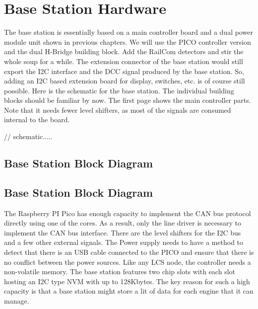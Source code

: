 \chapter{Base Station Hardware}

The base station is essentially based on a main controller board and a dual power module unit shown in previous chapters. We will use the PICO controller version and the dual H-Bridge building block. Add the RailCom detectors and stir the whole soup for a while. The extension connector of the base station would still export the I2C interface and the DCC signal produced by the base station. So, adding an I2C based extension board for display, switches, etc. is of course still possible. Here is the schematic for the base station. The individual building blocks should be familiar by now. The first page shows the main controller parts. Note that it needs fewer level shifters, as most of the signals are consumed internal to the board.

// schematic.....

\section{Base Station Block Diagram}


\section{Base Station Block Diagram}

The Raspberry PI Pico has enough capacity to implement the CAN bus protocol directly using one of the cores. As a result, only the line driver is necessary to implement the CAN bus interface. There are the level shifters for the I2C bus and a few other external signals. The Power supply needs to have a method to detect that there is an USB cable connected to the PICO and ensure that there is no conflict between the power sources. Like any LCS node, the controller needs a non-volatile memory. The base station features two chip slots with each slot hosting an I2C type NVM with up to 128Kbytes. The key reason for such a high capacity is that a base station might store a lit of data for each engine that it can manage.

